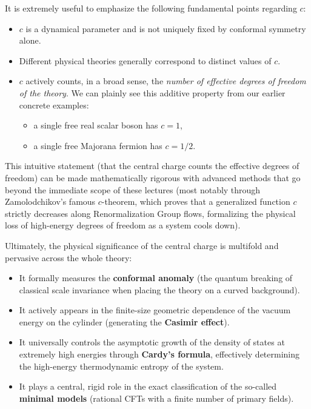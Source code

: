 It is extremely useful to emphasize the following fundamental points regarding \(c\):
\begin{itemize}
    \item \(c\) is a dynamical parameter and is not uniquely fixed by conformal symmetry alone.
    \item Different physical theories generally correspond to distinct values of \(c\).
    \item \(c\) actively counts, in a broad sense, the \textit{number of effective degrees of freedom of the theory}. We can plainly see this additive property from our earlier concrete examples:
          \begin{itemize}
              \item a single free real scalar boson has \(c = 1\),
              \item a single free Majorana fermion has \(c = 1/2\).
          \end{itemize}
\end{itemize}

This intuitive statement (that the central charge counts the effective degrees of freedom) can be made mathematically rigorous with advanced methods that go beyond the immediate scope of these lectures (most notably through Zamolodchikov's famous \(c\)-theorem, which proves that a generalized function \(c\) strictly decreases along Renormalization Group flows, formalizing the physical loss of high-energy degrees of freedom as a system cools down).

Ultimately, the physical significance of the central charge is multifold and pervasive across the whole theory:
\begin{itemize}
    \item It formally measures the \textbf{conformal anomaly} (the quantum breaking of classical scale invariance when placing the theory on a curved background).
    \item It actively appears in the finite-size geometric dependence of the vacuum energy on the cylinder (generating the \textbf{Casimir effect}).
    \item It universally controls the asymptotic growth of the density of states at extremely high energies through \textbf{Cardy's formula}, effectively determining the high-energy thermodynamic entropy of the system.
    \item It plays a central, rigid role in the exact classification of the so-called \textbf{minimal models} (rational CFTs with a finite number of primary fields).
\end{itemize}

